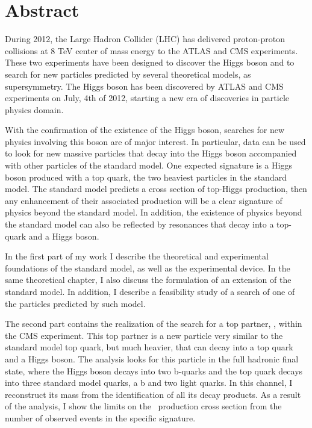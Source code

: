 \begingroup
\let\clearpage\relax
\let\cleardoublepage\relax
\let\cleardoublepage\relax

\chapter*{Abstract}

During 2012, the Large Hadron Collider (LHC) has delivered proton-proton collisions at 8 TeV center of mass energy to the ATLAS and CMS experiments. These two experiments have been designed to discover the Higgs boson and to search for new particles predicted by several theoretical models, as supersymmetry. The Higgs boson has been discovered by ATLAS and CMS experiments on July, 4th of 2012, starting a new era of discoveries in particle physics domain. %

With the confirmation of the existence of the Higgs boson, searches for new physics involving this boson are of major interest. In particular, data can be used to look for new massive particles that decay into the Higgs boson accompanied with other particles of the standard model. One expected signature is a Higgs boson produced with a top quark, the two heaviest particles in the standard model. The standard model predicts a cross section of top-Higgs production, then any enhancement of their associated production will be a clear signature of physics beyond the standard model. In addition, the existence of physics beyond the standard model can also be reflected by resonances that decay into a top-quark and a Higgs boson. 

In the first part of my work I describe the theoretical and experimental foundations of the standard model, as well as the experimental device. In the same theoretical chapter, I also discuss the formulation of an extension of the standard model. In addition, I describe a feasibility study of a search of one of the particles predicted by such model.

The second part contains the realization of the search for a top partner, \Tp, within the CMS experiment. This top partner is a new particle very similar to the standard model top quark, but much heavier, that can decay into a top quark and a Higgs boson. The analysis looks for this particle in the full hadronic final state, where the Higgs boson decays into two b-quarks and the top quark decays into three standard model quarks, a b and two light quarks. In this channel, I reconstruct its mass from the identification of all its decay products. As a result of the analysis, I show the limits on the \Tp~production cross section from the number of observed events in the specific signature.

